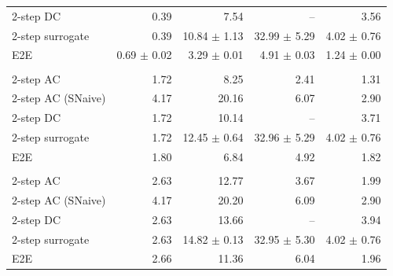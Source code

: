 \begin{longtable}{lrrrr}
2-step DC & 0.39 & 7.54 & -- & 3.56 \\
2-step surrogate & 0.39 & 10.84 $\pm$ 1.13 & 32.99 $\pm$ 5.29 & 4.02 $\pm$ 0.76 \\
E2E & 0.69 $\pm$ 0.02 & 3.29 $\pm$ 0.01 & 4.91 $\pm$ 0.03 & 1.24 $\pm$ 0.00 \\
\addlinespace[2pt]
\multicolumn{5}{@{}l}{\quad Horizon $H=6$} \\[2pt]
2-step AC & 1.72 & 8.25 & 2.41 & 1.31 \\
2-step AC (SNaive) & 4.17 & 20.16 & 6.07 & 2.90 \\
2-step DC & 1.72 & 10.14 & -- & 3.71 \\
2-step surrogate & 1.72 & 12.45 $\pm$ 0.64 & 32.96 $\pm$ 5.29 & 4.02 $\pm$ 0.76 \\
E2E & 1.80 & 6.84 & 4.92 & 1.82 \\
\addlinespace[2pt]
\multicolumn{5}{@{}l}{\quad Horizon $H=24$} \\[2pt]
2-step AC & 2.63 & 12.77 & 3.67 & 1.99 \\
2-step AC (SNaive) & 4.17 & 20.20 & 6.09 & 2.90 \\
2-step DC & 2.63 & 13.66 & -- & 3.94 \\
2-step surrogate & 2.63 & 14.82 $\pm$ 0.13 & 32.95 $\pm$ 5.30 & 4.02 $\pm$ 0.76 \\
E2E & 2.66 & 11.36 & 6.04 & 1.96 \\
\end{longtable}
\endgroup
